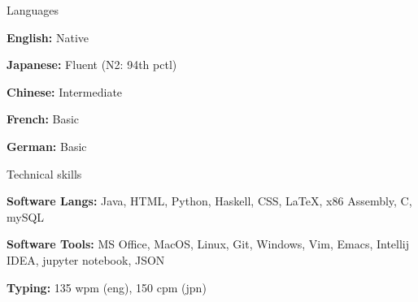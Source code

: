\documentclass{resume} %
\begin{document}

\begin{rSection}{Languages}
	\item \textbf{English:} Native
	\item \textbf{Japanese:} Fluent (N2: 94th pctl)
	\item \textbf{Chinese:} Intermediate
	\item \textbf{French:} Basic
	\item \textbf{German:} Basic
\end{rSection}


\begin{rSection}{Technical skills}
	\item \textbf{Software Langs:} 
    	Java, HTML, Python, Haskell, CSS, \LaTeX, x86 Assembly, C, mySQL
	\item \textbf{Software Tools:} 
    	MS Office, MacOS, Linux, Git, Windows, Vim, Emacs, Intellij IDEA, jupyter notebook, JSON
	\item \textbf{Typing:} 135 wpm (eng), 150 cpm (jpn)
\end{rSection}

\end{document}

